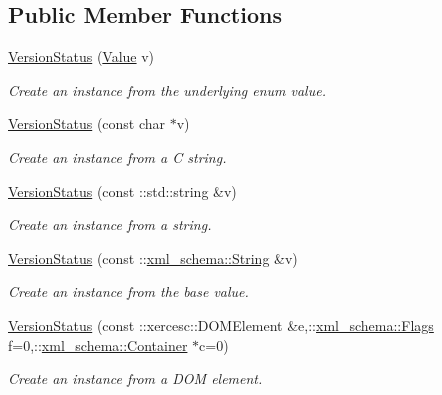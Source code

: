 \subsection*{Public Member Functions}
\begin{DoxyCompactItemize}
\item 
\hyperlink{classopenstack_1_1xml_1_1VersionStatus_a743ae9c09e9df328b3c8088e3847da59}{VersionStatus} (\hyperlink{classopenstack_1_1xml_1_1VersionStatus_a349f60055c2660ef73373729319b10f5}{Value} v)
\begin{DoxyCompactList}\small\item\em Create an instance from the underlying enum value. \item\end{DoxyCompactList}\item 
\hyperlink{classopenstack_1_1xml_1_1VersionStatus_a2cb7b0339b2291cfea7f03570f75f30c}{VersionStatus} (const char $\ast$v)
\begin{DoxyCompactList}\small\item\em Create an instance from a C string. \item\end{DoxyCompactList}\item 
\hyperlink{classopenstack_1_1xml_1_1VersionStatus_a5978153d1315f02428d926310c37d9f7}{VersionStatus} (const ::std::string \&v)
\begin{DoxyCompactList}\small\item\em Create an instance from a string. \item\end{DoxyCompactList}\item 
\hyperlink{classopenstack_1_1xml_1_1VersionStatus_ac35f12773caf43c037091ede49476638}{VersionStatus} (const ::\hyperlink{namespacexml__schema_af6757b5701ccc893f3b551bd70e0c94d}{xml\_\-schema::String} \&v)
\begin{DoxyCompactList}\small\item\em Create an instance from the base value. \item\end{DoxyCompactList}\item 
\hyperlink{classopenstack_1_1xml_1_1VersionStatus_ae6176e94c8a239e6d88e40b5cf050409}{VersionStatus} (const ::xercesc::DOMElement \&e,::\hyperlink{namespacexml__schema_affb4c227cbd9aa7453dd1dc5a1401943}{xml\_\-schema::Flags} f=0,::\hyperlink{namespacexml__schema_a333dea2213742aea47a37532dec4ec27}{xml\_\-schema::Container} $\ast$c=0)
\begin{DoxyCompactList}\small\item\em Create an instance from a DOM element. \item\end{DoxyCompactList}\item 

\end{DoxyCompactItemize}
